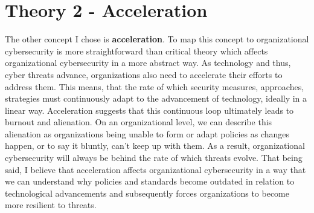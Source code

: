 \documentclass[12pt]{article}
\begin{document}
\section{Theory 2 - Acceleration}
The other concept I chose is \textbf{acceleration}. To map this concept to organizational cybersecurity is more straightforward than critical theory which affects organizational cybersecurity in a more abstract way. 
\newline
As technology and thus, cyber threats advance, organizations also need to accelerate their efforts to address them. This means, that the rate of which security measures, approaches, strategies must continuously adapt to the advancement of technology, ideally in a linear way.
\newline
Acceleration suggests that this continuous loop ultimately leads to burnout and alienation. On an organizational level, we can describe this alienation as organizations being unable to form or adapt policies as changes happen, or to say it bluntly, can't keep up with them. As a result, organizational cybersecurity will always be behind the rate of which threats evolve. 
\newline
That being said, I believe that acceleration affects organizational cybersecurity in a way that we can understand why policies and standards become outdated in relation to technological advancements and subsequently forces organizations to become more resilient to threats.
\end{document}
